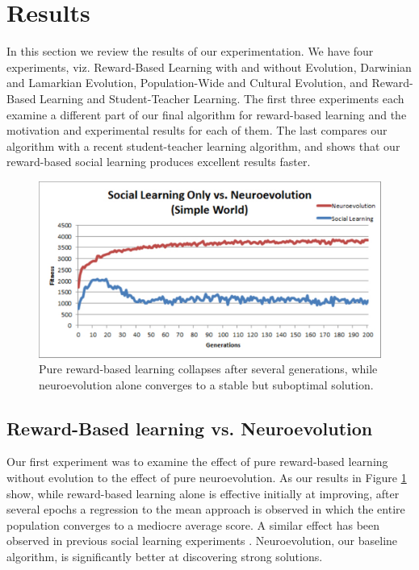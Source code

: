 \documentclass{acm_proc_article-sp}
\begin{document}
\section{Results}
\label{sec:results}
In this section we review the results of our experimentation.  We have four experiments, viz. Reward-Based Learning with and without Evolution, Darwinian and Lamarkian Evolution, Population-Wide and Cultural Evolution, and Reward-Based Learning and Student-Teacher Learning.   The first three experiments each examine a different part of our final algorithm for reward-based learning and the motivation and experimental results for each of them.  The last compares our algorithm with a recent student-teacher learning algorithm, and shows that our reward-based social learning produces excellent results faster.

\begin{figure}
  \centering
    \includegraphics[scale=.35]{social_learning_vs_neuroevolution.pdf}
  \caption{Pure reward-based learning collapses after several generations, while neuroevolution alone converges to a stable but suboptimal solution.}
  \label{fig:social-neuro}
\end{figure}

\subsection*{Reward-Based learning vs. Neuroevolution}

Our first experiment was to examine the effect of pure reward-based learning without evolution to the effect of pure neuroevolution.  As our results in Figure \ref{fig:social-neuro} show, while reward-based learning alone is effective initially at improving, after several epochs a regression to the mean approach is observed in which the entire population converges to a mediocre average score. A similar effect has been observed in previous social learning experiments \cite{denaro1996cultural}.   Neuroevolution, our baseline algorithm, is significantly better at discovering strong solutions. 
\end{document}

